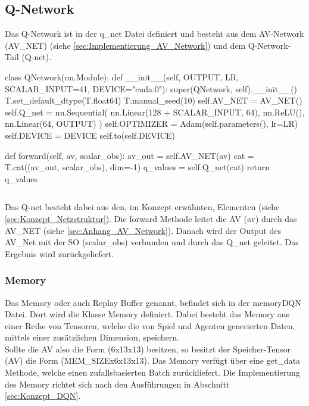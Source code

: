 \subsection{Q-Network} \label{sec:Implementierung_Q-Network}
Das Q-Network ist in der q\_net Datei definiert und besteht aus dem AV-Network (AV\_NET) (siehe \ref{sec:Implementierung_AV_Network}) und dem Q-Network-Tail (Q-net).
\begin{python}
class QNetwork(nn.Module):
	def __init__(self, OUTPUT, LR, SCALAR_INPUT=41, DEVICE="cuda:0"):
		super(QNetwork, self).__init__()
		T.set_default_dtype(T.float64)
		T.manual_seed(10)
		self.AV_NET = AV_NET()
		self.Q_net = nn.Sequential(
			nn.Linear(128 + SCALAR_INPUT, 64),
			nn.ReLU(),
			nn.Linear(64, OUTPUT)
		)
		self.OPTIMIZER = Adam(self.parameters(), lr=LR)
		self.DEVICE = DEVICE
		self.to(self.DEVICE)
	
	def forward(self, av, scalar_obs):
		av_out = self.AV_NET(av)
		cat = T.cat((av_out, scalar_obs), dim=-1)
		q_values = self.Q_net(cat)
		return q_values
\end{python}
\begin{lstlisting}[caption=PyTorch Implementierung des QNetwork]
\end{lstlisting}
Das Q-net besteht dabei aus den, im Konzept erwähnten, Elementen (siehe \ref{sec:Konzept_Netzstruktur}).
Die forward Methode leitet die AV (av) durch das AV\_NET (siehe \ref{sec:Anhang_AV_Network}). Danach wird der Output des AV\_Net mit der SO (scalar\_obs) verbunden und durch das Q\_net geleitet. Das Ergebnis wird zurückgeliefert.

\subsubsection{Memory} \label{sec:Implementierung_Memory}
Das Memory oder auch Replay Buffer genannt, befindet sich in der memoryDQN Datei. Dort wird die Klasse Memory definiert. Dabei besteht das Memory aus einer Reihe von Tensoren, welche die von Spiel und Agenten generierten Daten, mittels einer zusätzlichen Dimension, speichern.\\
Sollte die AV also die Form (6x13x13) besitzen, so besitzt der Speicher-Tensor (AV) die Form (MEM\_SIZEx6x13x13).
Das Memory verfügt über eine get\_data Methode, welche einen zufallsbasierten Batch zurückliefert. Die Implementierung des Memory richtet sich nach den Ausführungen in Abschnitt \ref{sec:Konzept_DQN}.

